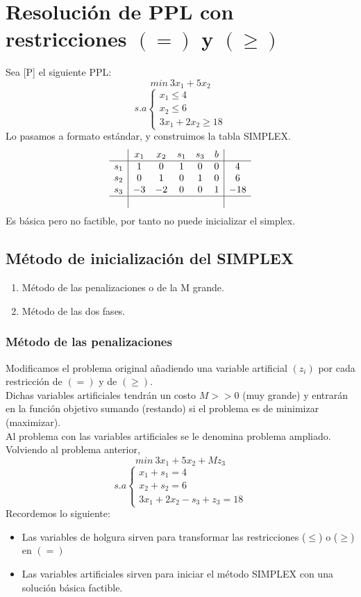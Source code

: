 \documentclass[11pt,fleqn]{book} %
\begin{document}
\section{Resolución de PPL con restricciones $(=)$ y $(\geq)$}
Sea [P] el siguiente PPL:
$$ min ~ 3x_1+5x_2 $$
$$ s.a \left\{
\begin{array}{c}
x_1 \leq 4 \\
x_2 \leq 6 \\
3x_1+2x_2 \geq 18
\end{array}
\right.
$$
Lo pasamos a formato estándar, y construimos la tabla SIMPLEX.
$$
\begin{array}{c|ccccc|c} 
& x_1 & x_2 & s_1 & s_3 & b \\ \hline
s_1 & 1 & 0 & 1 & 0 & 0 & 4 \\
s_2 & 0 & 1 & 0 & 1 & 0 & 6 \\
s_3 & -3 & -2 & 0 & 0 & 1 & -18 \\ \hline
& & & & &
\end{array}
$$
Es básica pero no factible, por tanto no puede inicializar el simplex.

\subsection{Método de inicialización del SIMPLEX}
\begin{enumerate}
	\item Método de las penalizaciones o de la M grande.
	\item Método de las dos fases.
\end{enumerate}

\subsubsection{Método de las penalizaciones}
Modificamos el problema original añadiendo una variable artificial $(z_i)$ por cada restricción de $(=)$ y de $(\geq)$. \\
Dichas variables artificiales tendrán un costo $M>>0$ (muy grande) y entrarán en la función objetivo sumando (restando) si el problema es de minimizar (maximizar). \\
Al problema con las variables artificiales se le denomina problema ampliado. \\

Volviendo al problema anterior, 
$$ min ~ 3x_1+5x_2+M z_3 $$
$$ s.a \left\{
\begin{array}{c}
x_1+s_1=4 \\
x_2 + s_2 = 6 \\
3x_1+2x_2-s_3+z_3=18
\end{array}
\right.
$$
Recordemos lo siguiente:
\begin{itemize}
	\item Las variables de holgura sirven para transformar las restricciones ($\leq$) o ($\geq$) en $(=)$
	\item Las variables artificiales sirven para iniciar el método SIMPLEX con una solución básica factible.
\end{itemize}
\end{document}
